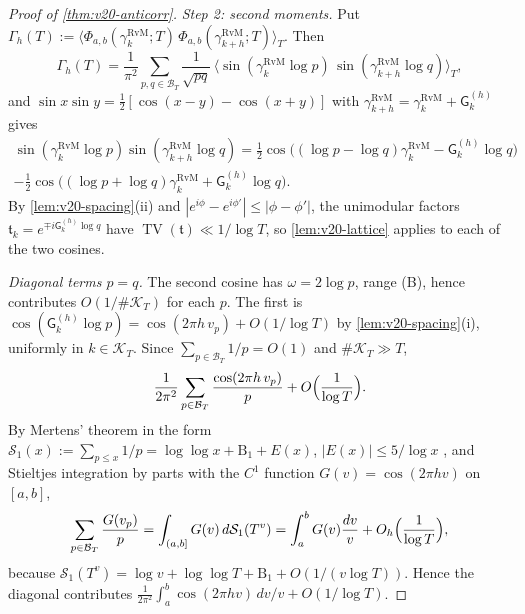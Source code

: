 \documentclass[11pt,a4paper]{article}
\numberwithin{equation}{section}
\theoremstyle{definition}
\theoremstyle{remark}
\begin{document}
\begin{proof}[Proof of \cref{thm:v20-anticorr}]
\emph{Step 2: second moments.} Put $\Gamma_h(T):=\langle\Phi_{a,b}(\gamma^{\mathrm{RvM}}_k;T)\,\Phi_{a,b}(\gamma^{\mathrm{RvM}}_{k+h};T)\rangle_T$. Then
\begin{equation}\label{eq:v20-gamma-expand}
 \Gamma_h(T)=\frac1{\pi^2}\sum_{p,q\in\mathcal B_T}\frac1{\sqrt{pq}}\,\bigl\langle\sin(\gamma^{\mathrm{RvM}}_k\log p)\,\sin(\gamma^{\mathrm{RvM}}_{k+h}\log q)\bigr\rangle_T ,
\end{equation}
and $\sin x\sin y=\frac12[\cos(x-y)-\cos(x+y)]$ with $\gamma^{\mathrm{RvM}}_{k+h}=\gamma^{\mathrm{RvM}}_k+\mathsf G_k^{(h)}$ gives
\begin{multline}
 \sin(\gamma^{\mathrm{RvM}}_k\log p)\sin(\gamma^{\mathrm{RvM}}_{k+h}\log q)=\tfrac12\cos\bigl((\log p-\log q)\gamma^{\mathrm{RvM}}_k-\mathsf G_k^{(h)}\log q\bigr)\\
 -\tfrac12\cos\bigl((\log p+\log q)\gamma^{\mathrm{RvM}}_k+\mathsf G_k^{(h)}\log q\bigr).
\end{multline}
By \cref{lem:v20-spacing}(ii) and $|e^{i\phi}-e^{i\phi'}|\le|\phi-\phi'|$, the unimodular factors $\mathfrak t_k=e^{\mp i\mathsf G_k^{(h)}\log q}$ have $\operatorname{TV}(\mathfrak t)\ll1/\log T$, so \cref{lem:v20-lattice} applies to each of the two cosines.

\emph{Diagonal terms $p=q$.} The second cosine has $\omega=2\log p$, range (B), hence contributes $O(1/\#\mathcal K_T)$ for each $p$. The first is $\cos(\mathsf G_k^{(h)}\log p)=\cos(2\pi h\,v_p)+O(1/\log T)$ by \cref{lem:v20-spacing}(i), uniformly in $k\in\mathcal K_T$. Since $\sum_{p\in\mathcal B_T}1/p=O(1)$ and $\#\mathcal K_T\gg T$,
\begin{equation}\label{eq:v20-diag}
 \frac1{2\pi^2}\sum_{p\in\mathcal B_T}\frac{\cos(2\pi h\,v_p)}p+O\Bigl(\frac1{\log T}\Bigr).
\end{equation}
By Mertens' theorem \cite{Mertens1874} in the form $\mathcal S_1(x):=\sum_{p\le x}1/p=\log\log x+\mathrm B_1+E(x)$, $|E(x)|\le5/\log x$ \cite[Thm.~1.10, p.~18]{Tenenbaum2015}, and Stieltjes integration by parts with the $C^1$ function $G(v)=\cos(2\pi hv)$ on $[a,b]$,
\begin{equation}
 \sum_{p\in\mathcal B_T}\frac{G(v_p)}p=\int_{(a,b]}G(v)\,d\mathcal S_1(T^v)=\int_a^bG(v)\frac{dv}v+O_h\Bigl(\frac1{\log T}\Bigr),
\end{equation}
because $\mathcal S_1(T^v)=\log v+\log\log T+\mathrm B_1+O(1/(v\log T))$. Hence the diagonal contributes $\frac1{2\pi^2}\int_a^b\cos(2\pi hv)\,dv/v+O(1/\log T)$.


\end{proof}
\end{document}
